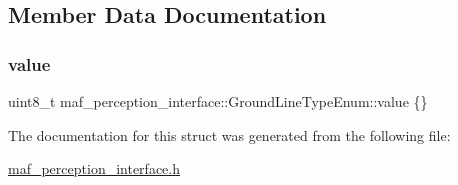 \subsection{Member Data Documentation}
\mbox{\label{structmaf__perception__interface_1_1GroundLineTypeEnum_adf2a155e33a6b485bdaaab85d1adbc49}} 
\subsubsection{\texorpdfstring{value}{value}}
{\footnotesize\ttfamily uint8\+\_\+t maf\+\_\+perception\+\_\+interface\+::\+Ground\+Line\+Type\+Enum\+::value \{\}}



The documentation for this struct was generated from the following file\+:\begin{DoxyCompactItemize}
\item 
\hyperlink{maf__perception__interface_8h}{maf\+\_\+perception\+\_\+interface.\+h}\end{DoxyCompactItemize}
